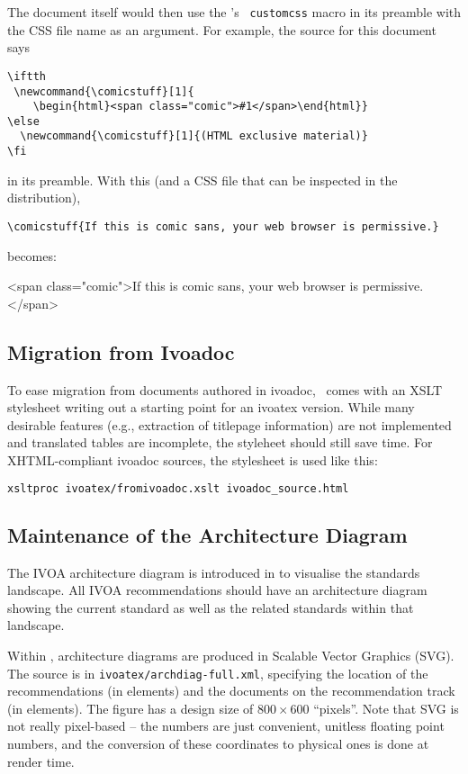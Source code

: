 \documentclass[11pt,a4paper]{ivoa}
\newcommand{\texword}[1]{\texttt{\color{texcolor} #1}}
\newcommand{\comicstuff}[1]{
    \begin{html}<span class="comic">#1</span>\end{html}}
\newcommand{\comicstuff}[1]{(HTML exclusive material)}
\begin{document}
The document itself would then use the \ivoatex's \texword{customcss}
macro in its preamble with the CSS file name as an argument.  For
example, the source for this document says

\begin{lstlisting}
\iftth
 \newcommand{\comicstuff}[1]{
    \begin{html}<span class="comic">#1</span>\end{html}}
\else
  \newcommand{\comicstuff}[1]{(HTML exclusive material)}
\fi
\end{lstlisting}

\noindent in its preamble.  With this (and a CSS file that can be inspected in the
distribution),

\begin{lstlisting}
\comicstuff{If this is comic sans, your web browser is permissive.}
\end{lstlisting}

\noindent becomes: 
\comicstuff{If this is comic sans, your web browser is permissive.}

\subsection{Migration from Ivoadoc}

To ease migration from documents authored in ivoadoc, \ivoatex\ comes
with an XSLT stylesheet writing out a starting point for an ivoatex
version.  While many desirable features (e.g., extraction of titlepage
information) are not implemented and translated tables are incomplete,
the styleheet should still save time.  For XHTML-compliant ivoadoc
sources, the stylesheet is used like this:

\begin{lstlisting}[language=sh]
xsltproc ivoatex/fromivoadoc.xslt ivoadoc_source.html
\end{lstlisting}

\subsection{Maintenance of the Architecture Diagram}

The IVOA architecture diagram is introduced in \citet{note:VOARCH} to
visualise the standards landscape.  All IVOA recommendations should have
an architecture diagram showing the current standard as well as the
related standards within that landscape.

Within \ivoatex, architecture diagrams are produced in Scalable Vector
Graphics (SVG).  The source is in \texttt{ivoatex/archdiag-full.xml},
specifying the location of the recommendations (in  elements)
and the documents on the recommendation track (in 
elements).  The figure has a design size of $800\times 600$ ``pixels''.
Note that SVG is not really pixel-based -- the numbers are just
convenient, unitless floating point numbers, and the conversion of these
coordinates to physical ones is done at render time.
\end{document}
